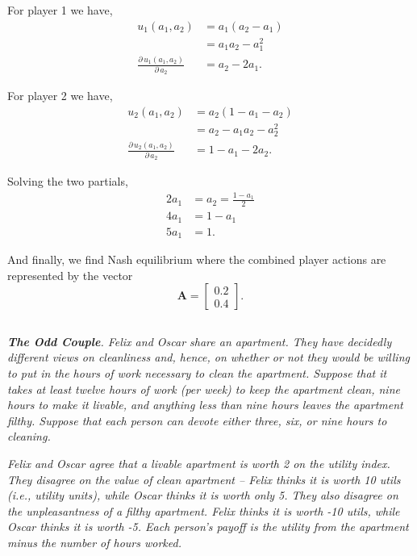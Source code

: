 \documentclass[12pt]{amsart}
\begin{document}
	For player 1 we have,
	\begin{align*}
		u_1(a_1,a_2) &= a_1(a_2-a_1) \\
					 &= a_1a_2-a_1^2 \\
		\frac{\partial\,u_1(a_1,a_2)}{\partial\,a_2} &= a_2-2a_1.
	\end{align*}
	
	For player 2 we have,
	\begin{align*}
		u_2(a_1,a_2) &= a_2(1-a_1-a_2) \\
					 &= a_2-a_1a_2-a_2^2 \\
		\frac{\partial\,u_2(a_1,a_2)}{\partial\,a_2} &= 1-a_1-2a_2.
	\end{align*}
	
	Solving the two partials,
	\begin{align*}
		2a_1 &= a_2 = \frac{1-a_1}{2} \\
		4a_1 &= 1-a_1 \\
		5a_1 &= 1.
	\end{align*}

	And finally, we find Nash equilibrium where the combined player actions are represented by the vector
	\[\mathbf A = \begin{bmatrix} 0.2 \\0.4 \end{bmatrix}.\]

\subsection{}
\textit{\textbf{The Odd Couple}. Felix and Oscar share an apartment. They have decidedly different views
	on cleanliness and, hence, on whether or not they would be willing to put in the hours of
	work necessary to clean the apartment. Suppose that it takes at least twelve hours of work
	(per week) to keep the apartment clean, nine hours to make it livable, and anything less
	than nine hours leaves the apartment filthy. Suppose that each person can devote either
	three, six, or nine hours to cleaning.}
	
\textit{Felix and Oscar agree that a livable apartment is worth 2 on the utility index. They
	disagree on the value of clean apartment – Felix thinks it is worth 10 utils (i.e., utility units),
	while Oscar thinks it is worth only 5. They also disagree on the unpleasantness of a filthy
	apartment. Felix thinks it is worth -10 utils, while Oscar thinks it is worth -5. Each person’s
	payoff is the utility from the apartment minus the number of hours worked.}
\end{document}
